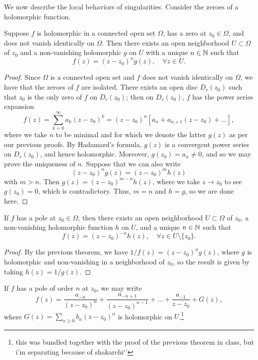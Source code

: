 \noindent We now describe the local behaviors of singularities. Consider the zeroes of a holomorphic function.
\begin{theorem}[\S 3.1.1]
    Suppose $f$ is holomorphic in a connected open set $\Omega$, has a zero at $z_0 \in \Omega$, and does not vanish identically on $\Omega$. Then there exists an open neighborhood $U \subset \Omega$ of $z_0$ and a non-vanishing holomorphic $g$ on $U$ with a unique $n \in \mathbb N$ such that
    \[ f(z) = (z - z_0)^n g(z), \quad \forall z \in U. \]
\end{theorem}
\begin{proof}
    Since $\Omega$ is a connected open set and $f$ does not vanish identically on $\Omega$, we have that the zeroes of $f$ are isolated. There exists an open disc $D_r(z_0)$ such that $z_0$ is the only zero of $f$ on $D_r(z_0)$; then on $D_r(z_0)$, $f$ has the power series expansion
    \[ f(z) = \sum_{k=0}^\infty a_k(z - z_0)^k = (z - z_0)^n \left[a_n + a_{n+1}(z - z_0) + \dots \right], \]
    where we take $n$ to be minimal and for which we denote the latter $g(z)$ as per our previous proofs. By Hadamard's formula, $g(z)$ is a convergent power series on $D_r(z_0)$, and hence holomorphic. Moreover, $g(z_0) = a_n \neq 0$, and so we may prove the uniqueness of $n$. Suppose that we can also write
    \[ (z - z_0)^n g(z) = (z - z_0)^m h(z) \]
    with $m > n$. Then $g(z) = (z - z_0)^{m-n} h(z)$, where we take $z \to z_0$ to see $g(z_0)= 0$, which is contradictory. Thus, $m = n$ and $h = g$, so we are done here.
\end{proof}
\begin{theorem}[\S 3.1.2]
    If $f$ has a pole at $z_0 \in \Omega$, then there exists an open neighborhood $U \subset \Omega$ of $z_0$, a non-vanishing holomorphic function $h$ on $U$, and a unique $n \in \mathbb N$ such that
    \[ f(z) = (z - z_0)^{-n} h(z), \quad \forall z \in U \setminus \{z_0\}. \]
\end{theorem}
\begin{proof}
    By the previous theorem, we have $1/f(z) = (z - z_0)^n g(z)$, where $g$ is holomorphic and non-vanishing in a neighborhood of $z_0$, so the result is given by taking $h(z) = 1/g(z)$.
\end{proof}
\begin{theorem}[\S 3.1.3]
    If $f$ has a pole of order $n$ at $z_0$, we may write
    \[ f(z) = \frac{a_{-n}}{(z - z_0)^n} + \frac{a_{-n+1}}{(z - z_0)^{n-1}} + \dots + \frac{a_{-1}}{z - z_0} + G(z), \]
    where $G(z) = \sum_{n \geq 0} b_n(z - z_0)^n$ is holomorphic on $U$.\footnote{this was bundled together with the proof of the previous theorem in class, but i'm separating because of shakarchi`'}
\end{theorem}
